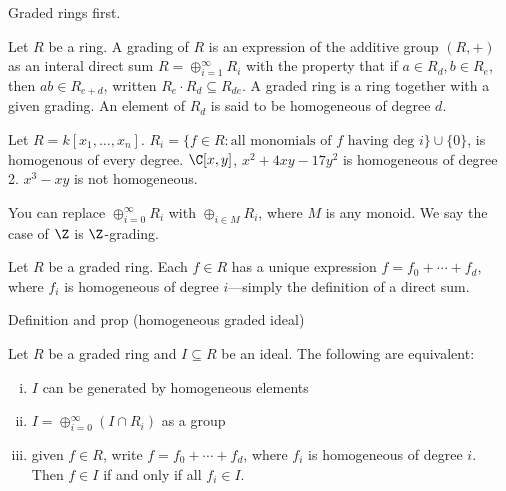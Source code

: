 Graded rings first.

\begin{dfn}[Grading]
Let $R$ be a ring. A grading of $R$ is an expression of the additive group $(R,+)$ as an interal direct sum $R= \oplus_{i=1}^\infty R_i$ with the property that if $a \in R_d, b \in R_e$, then $ab \in R_{e+d}$, written $R_e \cdot R_d \subseteq R_{de}$. A graded ring is a ring together with a given grading. An element of $R_d$ is said to be homogeneous of degree $d$. 
\end{dfn}


\begin{ex}
Let $R= k[x_1,\ldots,x_n]$. $R_i= \{ f \in R \colon \text{all monomials of }f\text{ having deg }i\} \cup \{0\}$, is homogenous of every degree. $\C[x,y]$, $x^2+4xy-17y^2$ is homogeneous of degree 2. $x^3-xy$ is not homogeneous. \xqed
\end{ex}


\begin{rem}
You can replace $\oplus_{i=0}^\infty R_i$ with $\oplus_{i \in M} R_i$, where $M$ is any monoid. We say the case of $\Z$ is $\Z$-grading. 
\end{rem}


Let $R$ be a graded ring. Each $f \in R$ has a unique expression $f= f_0 + \cdots + f_d$, where $f_i$ is homogeneous of degree $i$---simply the definition of a direct sum. 


















Definition and prop (homogeneous graded ideal)


\begin{prop}
Let $R$ be a graded ring and $I \subseteq R$ be an ideal. The following are equivalent:
\begin{enumerate}[(i)]
\item $I$ can be generated by homogeneous elements
\item $I= \oplus_{i=0}^\infty (I \cap R_i)$ as a group
\item given $f \in R$, write $f= f_0 + \cdots + f_d$, where $f_i$ is homogeneous of degree $i$. Then $f \in I$ if and only if all $f_i \in I$. 
\end{enumerate}
\end{prop}


